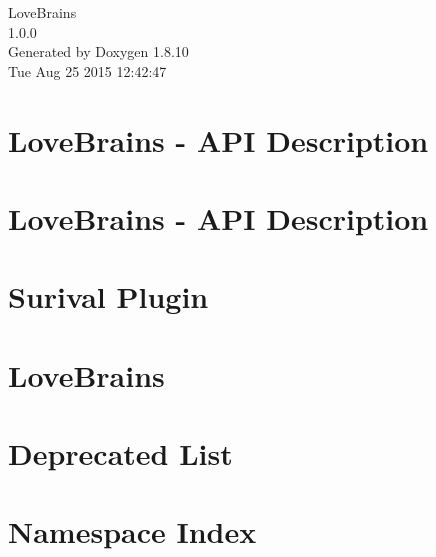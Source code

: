 \documentclass[twoside]{book}
\newcommand{\+}{\discretionary{\mbox{\scriptsize$\hookleftarrow$}}{}{}}
\newcommand{\clearemptydoublepage}{%
  \newpage{\pagestyle{empty}\cleardoublepage}%
}
\begin{document}
\begin{titlepage}
\vspace*{7cm}
\begin{center}%
{\Large Love\+Brains \\[1ex]\large 1.\+0.\+0 }\\
\vspace*{1cm}
{\large Generated by Doxygen 1.8.10}\\
\vspace*{0.5cm}
{\small Tue Aug 25 2015 12:42:47}\\
\end{center}
\end{titlepage}
\clearemptydoublepage
\tableofcontents
\clearemptydoublepage
{}

\chapter{Love\+Brains -\/ A\+P\+I Description}
\label{md__home_robin_f__programming__git__c_p_p__love_brains_api__r_e_a_d_m_e}

\chapter{Love\+Brains -\/ A\+P\+I Description}
\label{md__home_robin_f__programming__git__c_p_p__love_brains_mods_basic_survival_api__r_e_a_d_m_e}

\chapter{Surival Plugin}
\label{md__home_robin_f__programming__git__c_p_p__love_brains_mods_basic_survival__r_e_a_d_m_e}

\chapter{Love\+Brains}
\label{md__home_robin_f__programming__git__c_p_p__love_brains__r_e_a_d_m_e}

\chapter{Deprecated List}
\label{deprecated}

\chapter{Namespace Index}

\end{document}
